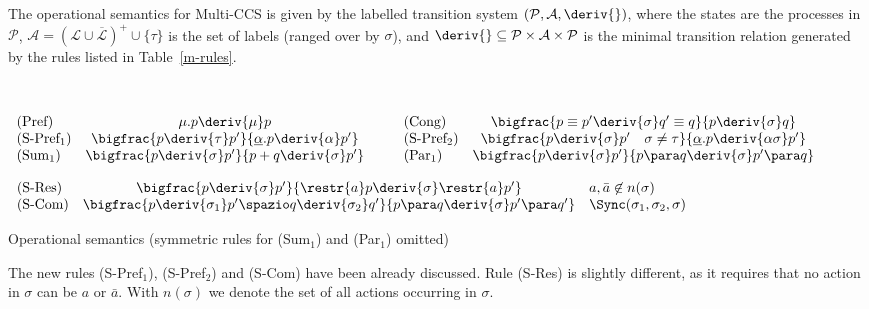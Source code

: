 The  operational semantics for Multi-CCS is given by the labelled 
transition system $({\mathcal P},{\mathcal A}, \deriv{ })$, where the states are the processes
in ${\mathcal P}$, ${\mathcal A} = (\mathcal{L} \cup \overline{\mathcal L})^+ \cup \{\tau\}$
is the set of labels (ranged over by $\sigma$),
and $\deriv{ } \subseteq {\mathcal P} \times{\mathcal A}\times{\mathcal P}$ is the minimal 
transition relation generated by the rules listed in Table~\ref{m-rules}. 


\begin{table}[t]
{\renewcommand{\arraystretch}{2.8}
\hrulefill\\[-.4cm]

\begin{center}
$\begin{array}{lcllcl}
\mbox{(Pref)}  & \mu.p\deriv{\mu}p & & \; \; \;
\mbox{(Cong)} & \bigfrac{p \equiv p' \deriv{\sigma}q' \equiv q}{p\deriv{\sigma}q} \\
\mbox{(S-Pref$_1$)}  & \bigfrac{p\deriv{\tau}p'}{\underline{\alpha}.p\deriv{\alpha}p'} & & \; \; \;
\mbox{(S-Pref$_2$)}  & \bigfrac{p\deriv{\sigma}p' \quad \sigma \neq \tau}{\underline{\alpha}.p\deriv{\alpha\sigma}p'} \\
\mbox{(Sum$_1$)}  & \bigfrac{p\deriv{\sigma}p'}{p+q\deriv{\sigma}p'}  & & \; \; \;
\mbox{(Par$_1$)}  & \bigfrac{p\deriv{\sigma}p'}{p\para q\deriv{\sigma}p'\para q} \\
\end{array}$

$\begin{array}{lcllcl}
\mbox{(S-Res)}  & \bigfrac{p\deriv{\sigma}p'}{\restr{a}p\deriv{\sigma}
\restr{a}p'} & a, \bar{a} \not\in n(\sigma) \\
\mbox{(S-Com)}  & \bigfrac{p\deriv{\sigma_1} p'\spazio q\deriv{\sigma_2}q'}{p
\para q \deriv{\sigma}p'\para q'} & \Sync(\sigma_1,  \sigma_2, \sigma) \\
\end{array}$

\hrulefill
\end{center}}
\caption{Operational semantics (symmetric rules for (Sum$_1$) and (Par$_1$) omitted)}\label{m-rules}
\end{table}


The new rules (S-Pref$_1$), (S-Pref$_2$) and (S-Com) have been already discussed.
Rule (S-Res) is slightly different, as it requires that no action in $\sigma$ can be $a$ or $\bar{a}$.
With $n(\sigma)$ we denote the set of all actions occurring in $\sigma$.

